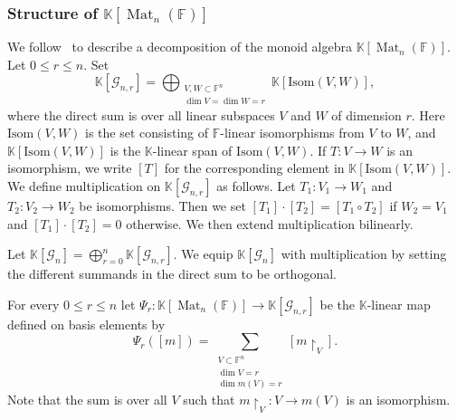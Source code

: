 \documentclass[12pt, reqno]{amsart}
\theoremstyle{definition}
\newcommand{\coefficientsField}{\mathbb{K}}
\newcommand{\Isom}{\mathrm{Isom}}
\newcommand{\finiteField}{\mathbb{F}}
\newcommand{\squareMatrix}{\operatorname{Mat}}
\begin{document}
	\subsubsection{Structure of $\coefficientsField\left[\squareMatrix_n\left(\finiteField\right)\right]$}
	We follow~\cite[Section 2.2]{HarmanSnowdenZelingher2025} to describe a decomposition of the monoid algebra $\coefficientsField\left[\squareMatrix_n\left(\finiteField\right)\right]$. Let $0 \le r \le n$. Set
	\begin{displaymath}
	\coefficientsField\left[\mathcal{G}_{n,r}\right] = \bigoplus_{\substack{V,W \subset \finiteField^n\\
	\dim V = \dim W = r}} \coefficientsField\left[\Isom\left(V, W\right)\right],
	\end{displaymath}
	where the direct sum is over all linear subspaces $V$ and $W$ of dimension $r$. Here $\Isom\left(V, W\right)$ is the set consisting of $\finiteField$-linear isomorphisms from $V$ to $W$, and $\coefficientsField\left[\Isom\left(V,W\right)\right]$ is the $\coefficientsField$-linear span of $\Isom\left(V, W\right)$. If $T \colon V \to W$ is an isomorphism, we write $\left[T\right]$ for the corresponding element in $\coefficientsField\left[\Isom\left(V,W\right)\right]$. We define multiplication on $\coefficientsField\left[\mathcal{G}_{n,r}\right]$ as follows. Let $T_1 \colon V_1 \to W_1$ and $T_2 \colon V_2 \to W_2$ be isomorphisms. Then we set $\left[T_1\right] \cdot \left[T_2\right] = \left[T_1 \circ T_2\right]$ if $W_2 = V_1$ and $\left[T_1\right] \cdot \left[T_2\right] = 0$ otherwise. We then extend multiplication bilinearly.
	
	Let $\coefficientsField\left[\mathcal{G}_n\right] = \bigoplus_{r = 0}^{n} \coefficientsField\left[\mathcal{G}_{n,r}\right]$. We equip $\coefficientsField\left[\mathcal{G}_n\right]$ with multiplication by setting the different summands in the direct sum to be orthogonal.
	
	For every $0 \le r \le n$ let $\Psi_r \colon \coefficientsField\left[\squareMatrix_n\left(\finiteField\right)\right] \to \coefficientsField\left[\mathcal{G}_{n,r}\right]$ be the $\coefficientsField$-linear map defined on basis elements by
	\begin{displaymath}
	\Psi_r\left(\left[m\right]\right) = \sum_{\substack{V \subset \finiteField^n\\
	\dim V = r\\
	\dim m\left(V\right) = r}} \left[m \restriction_{V}\right].
	\end{displaymath}
	Note that the sum is over all $V$ such that $m \restriction_V \colon V \to m\left(V\right)$ is an isomorphism.
	
\end{document}
